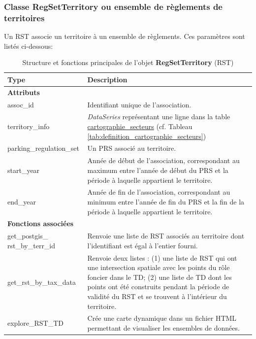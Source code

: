         \subsubsection{Classe RegSetTerritory ou ensemble de règlements de territoires}
            Un \ac{RST} associe un territoire à un ensemble de règlements. Ces paramètres sont listés ci-dessous:
            {\captionsetup{justification=centering}
            \setlength{\LTcapwidth}{\linewidth} 
            \begin{table}[H]
                \centering
                \caption{Structure et fonctions principales de l'objet \textbf{RegSetTerritory} (RST)}
                \label{tab:regsetterritory_structure}
                \begin{tabular}{p{5cm}p{11cm}}
                \toprule
                \textbf{Type} & \textbf{Description} \\
                \midrule
                \multicolumn{2}{l}{\textbf{Attributs}} \\
                \midrule
                assoc\_id & Identifiant unique de l'association. \\
                territory\_info & \textit{DataSeries} représentant une ligne dans la table \underline{cartographie\_secteurs} (cf. Tableau \ref{tab:definition_cartographie_secteurs}) \\
                parking\_regulation\_set & Un \ac{PRS} associé au territoire. \\
                start\_year & Année de début de l'association, correspondant au maximum entre l'année de début du \ac{PRS} et la période à laquelle appartient le territoire. \\
                end\_year & Année de fin de l'association, correspondant au minimum entre l'année de fin du \ac{PRS} et la fin de la période à laquelle appartient le territoire. \\
                \midrule
                \multicolumn{2}{l}{\textbf{Fonctions associées}} \\
                \midrule
                get\_postgis\_ rst\_by\_terr\_id & Renvoie une liste de \ac{RST} associés au territoire dont l'identifiant est égal à l'entier fourni. \\
                get\_rst\_by\_tax\_data & Renvoie deux listes : (1) une liste de \ac{RST} qui ont une intersection spatiale avec les points du rôle foncier dans le \ac{TD}; (2) une liste de \ac{TD} dont les points ont été construits pendant la période de validité du \ac{RST} et se trouvent à l'intérieur du territoire. \\
                explore\_RST\_TD & Crée une carte dynamique dans un fichier HTML permettant de visualiser les ensembles de données. \\
                \bottomrule
                \end{tabular}
            \end{table}}
            \clearpage
        
